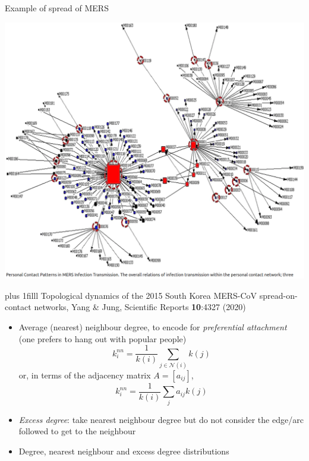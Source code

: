 \documentclass[aspectratio=43]{beamer}
\begin{document}
\begin{frame}{Example of spread of MERS}
	\begin{center}
	\hspace*{-\beamerleftmargin}
	\includegraphics[width=\paperwidth]{FIGS_slides/YangJung2015SouthKoreaMERS}
	\end{center}
	\vskip0pt plus 1filll
	\tiny
	Topological dynamics of the 2015 South Korea MERS-CoV spread-on-contact networks, Yang \& Jung, Scientific Reports \textbf{10}:4327 (2020)
\end{frame}


\begin{frame}
	\begin{itemize}
		\item Average (nearest) neighbour degree, to encode for \emph{preferential attachment} (one prefers to hang out with popular people)
		\[
			k_i^{nn} = \frac{1}{k(i)}\sum_{j\in\mathcal{N}(i)}k(j)
		\]
		or, in terms of the adjacency matrix $A=[a_{ij}]$,
		\[
			k_i^{nn} = \frac{1}{k(i)}\sum_{j}a_{ij}k(j)
		\]
		\item \emph{Excess degree}: take nearest neighbour degree but do not consider the edge/arc followed to get to the neighbour
		\item Degree, nearest neighbour and excess degree distributions
	\end{itemize}
\end{frame}
\end{document}
